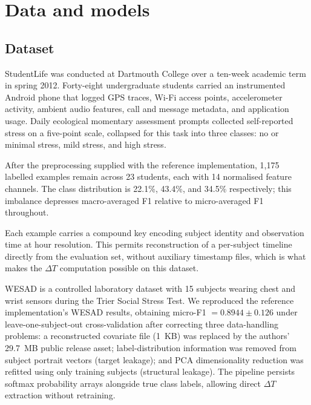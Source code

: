 \documentclass[preprint,12pt,authoryear]{elsarticle}
\newcommand{\dt}{$\Delta T$}
\providecommand{\DIFdeltex}[1]{{\protect\color{red} \scriptsize #1}} %
\providecommand{\DIFdelbegin}{} %
\providecommand{\DIFdel}[1]{\texorpdfstring{\DIFdeltex{#1}}{}} %
\newcommand{\DIFscaledelfig}{0.5}
\newlength{\DIFdelgraphicswidth} %
\newlength{\DIFdelgraphicsheight} %
\newcommand{\DIFdelincludegraphics}[2][]{%
\sbox{\DIFdelgraphicsbox}{\DIFOincludegraphics[#1]{#2}}%
\settoboxwidth{\DIFdelgraphicswidth}{\DIFdelgraphicsbox} %
\settoboxtotalheight{\DIFdelgraphicsheight}{\DIFdelgraphicsbox} %
\scalebox{\DIFscaledelfig}{%
\parbox[b]{\DIFdelgraphicswidth}{\usebox{\DIFdelgraphicsbox}\\[-\baselineskip] \rule{\DIFdelgraphicswidth}{0em}}\llap{\resizebox{\DIFdelgraphicswidth}{\DIFdelgraphicsheight}{%
\setlength{\unitlength}{\DIFdelgraphicswidth}%
\begin{picture}(1,1)%
\thicklines\linethickness{2pt} %
{\color[rgb]{1,0,0}\put(0,0){\framebox(1,1){}}}%
{\color[rgb]{1,0,0}\put(0,0){\line( 1,1){1}}}%
{\color[rgb]{1,0,0}\put(0,1){\line(1,-1){1}}}%
\end{picture}%
}\hspace*{3pt}}} %
} %
\DeclareRobustCommand{\DIFdelbegin}{\DIFOdelbegin \let\includegraphics\DIFdelincludegraphics} %
\begin{document}
\section{Data and models}

\subsection{Dataset}

StudentLife \citep{wang2014} was conducted at Dartmouth College over a
ten-week academic term in spring 2012. Forty-eight undergraduate students
carried an instrumented Android phone that logged GPS traces, Wi-Fi
access points, accelerometer activity, ambient audio features, call and
message metadata, and application usage. Daily ecological momentary
assessment prompts collected self-reported stress on a five-point scale,
collapsed for this task into three classes: no or minimal stress, mild
stress, and high stress.

After the preprocessing supplied with the reference implementation,
1{,}175 labelled examples remain across 23 students, each with 14
normalised feature channels. The class distribution is 22.1\%,
43.4\%, and 34.5\% respectively; this imbalance depresses
macro-averaged F1 relative to micro-averaged F1 throughout.

Each example carries a compound key encoding subject identity and
observation time at hour resolution. This permits reconstruction of a
per-subject timeline directly from the evaluation set, without auxiliary
timestamp files, which is what makes the \dt{} computation possible on
this dataset.

\DIFdelbegin %

\DIFdel{WESAD \citep{schmidt2018} is a controlled laboratory dataset with
15 subjects wearing chest and wrist sensors during the Trier Social
Stress Test. We reproduced the reference implementation's WESAD results,
obtaining micro-F1 $= 0.8944 \pm 0.126$ under leave-one-subject-out
cross-validation after correcting three data-handling problems: a
reconstructed covariate file (1~KB) was replaced by the authors'
29.7~MB public release asset; label-distribution information was removed
from subject portrait vectors (target leakage); and PCA dimensionality
reduction was refitted using only training subjects (structural leakage).
The pipeline persists softmax probability arrays alongside true class
labels, allowing direct \dt{} extraction without retraining.
}%
\end{document}
